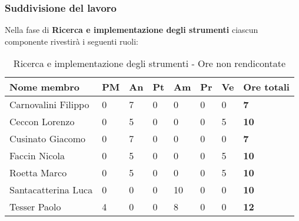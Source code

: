 		\subsubsection{Suddivisione del lavoro} %
		\label{ssub:suddivisione_del_lavoro}
		Nella fase di \textbf{Ricerca e implementazione degli strumenti} ciascun componente rivestirà i seguenti ruoli: \\
			\begin{table}[!ht]
				\begin{center}
					\begin{tabularx}{0.9\textwidth}{|l|l|l|l|l|l|l|X|}
						\hline
						\textbf{Nome membro} & \textbf{PM} & \textbf{An} & \textbf{Pt} & \textbf{Am} & \textbf{Pr} & \textbf{Ve} & \textbf{Ore totali} \\
						\hline
						Carnovalini Filippo & 0 & 7 & 0 & 0 & 0 & 0 & \textbf{7} \\
						\hline
						Ceccon Lorenzo & 0 & 5 & 0 & 0 & 0 & 5 & \textbf{10} \\
						\hline
						Cusinato Giacomo & 0 & 7 & 0 & 0 & 0 & 0 & \textbf{7} \\
						\hline
						Faccin Nicola & 0 & 5 & 0 & 0 & 0 & 5 & \textbf{10} \\
						\hline
						Roetta Marco & 0 & 5 & 0 & 0 & 0 & 5 & \textbf{10} \\
						\hline
						Santacatterina Luca & 0 & 0 & 0 & 10 & 0 & 0 & \textbf{10} \\
						\hline
						Tesser Paolo & 4 & 0 & 0 & 8 & 0 & 0 & \textbf{12} \\
						\hline
					\end{tabularx}
				\end{center}
			\caption{Ricerca e implementazione degli strumenti - Ore non rendicontate}
			\end{table}
			
